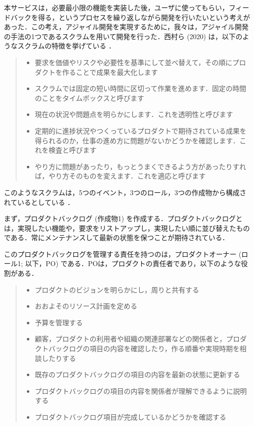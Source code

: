 本サービスは，必要最小限の機能を実装した後，ユーザに使ってもらい，フィードバックを得る，というプロセスを繰り返しながら開発を行いたいという考えがあった．この考え，アジャイル開発を実現するために，我々は，アジャイル開発の手法の1つであるスクラムを用いて開発を行った．西村ら (2020) は，以下のようなスクラムの特徴を挙げている \cite{scrum}．

\begin{quote}
    \begin{itemize}
        \item 要求を価値やリスクや必要性を基準にして並べ替えて，その順にプロダクトを作ることで成果を最大化します
        \item スクラムでは固定の短い時間に区切って作業を進めます．固定の時間のことをタイムボックスと呼びます
        \item 現在の状況や問題点を明らかにします．これを透明性と呼びます
        \item 定期的に進捗状況やつくっているプロダクトで期待されている成果を得られるのか，仕事の進め方に問題がないかどうかを確認します．これを検査と呼びます
        \item やり方に問題があったり，もっとうまくできるよう方があったりすれば，やり方そのものを変えます．これを適応と呼びます
    \end{itemize}
\end{quote}

このようなスクラムは，5つのイベント，3つのロール，3つの作成物から構成されているとしている \cite{scrum}．

まず，プロダクトバックログ (作成物1) を作成する．プロダクトバックログとは，実現したい機能や，要求をリストアップし，実現したい順に並び替えたものである．常にメンテナンスして最新の状態を保つことが期待されている．

このプロダクトバックログを管理する責任を持つのは，プロダクトオーナー (ロール1; 以下，PO) である．POは，プロダクトの責任者であり，以下のような役割がある．
\begin{quote}
    \begin{itemize}
        \item プロダクトのビジョンを明らかにし，周りと共有する
        \item おおよそのリソース計画を定める
        \item 予算を管理する
        \item 顧客，プロダクトの利用者や組織の関連部署などの関係者と，プロダクトバックログの項目の内容を確認したり，作る順番や実現時期を相談したりする
        \item 既存のプロダクトバックログの項目の内容を最新の状態に更新する
        \item プロダクトバックログの項目の内容を関係者が理解できるように説明する
        \item プロダクトバックログ項目が完成しているかどうかを確認する
    \end{itemize}
\end{quote}

